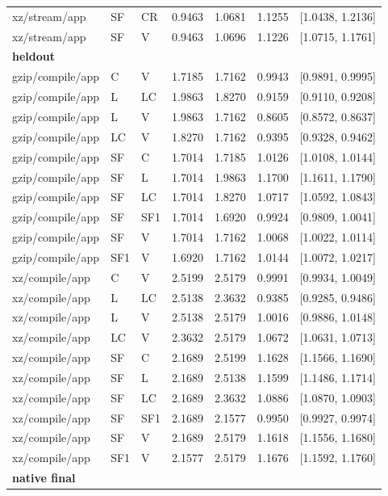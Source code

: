 \begin{longtable}{lllrrrr}
xz/stream/app & SF & CR & 0.9463 & 1.0681 & 1.1255 & [1.0438, 1.2136] \\
xz/stream/app & SF & V & 0.9463 & 1.0696 & 1.1226 & [1.0715, 1.1761] \\
\multicolumn{7}{l}{\textbf{heldout}} \\
gzip/compile/app & C & V & 1.7185 & 1.7162 & 0.9943 & [0.9891, 0.9995] \\
gzip/compile/app & L & LC & 1.9863 & 1.8270 & 0.9159 & [0.9110, 0.9208] \\
gzip/compile/app & L & V & 1.9863 & 1.7162 & 0.8605 & [0.8572, 0.8637] \\
gzip/compile/app & LC & V & 1.8270 & 1.7162 & 0.9395 & [0.9328, 0.9462] \\
gzip/compile/app & SF & C & 1.7014 & 1.7185 & 1.0126 & [1.0108, 1.0144] \\
gzip/compile/app & SF & L & 1.7014 & 1.9863 & 1.1700 & [1.1611, 1.1790] \\
gzip/compile/app & SF & LC & 1.7014 & 1.8270 & 1.0717 & [1.0592, 1.0843] \\
gzip/compile/app & SF & SF1 & 1.7014 & 1.6920 & 0.9924 & [0.9809, 1.0041] \\
gzip/compile/app & SF & V & 1.7014 & 1.7162 & 1.0068 & [1.0022, 1.0114] \\
gzip/compile/app & SF1 & V & 1.6920 & 1.7162 & 1.0144 & [1.0072, 1.0217] \\
xz/compile/app & C & V & 2.5199 & 2.5179 & 0.9991 & [0.9934, 1.0049] \\
xz/compile/app & L & LC & 2.5138 & 2.3632 & 0.9385 & [0.9285, 0.9486] \\
xz/compile/app & L & V & 2.5138 & 2.5179 & 1.0016 & [0.9886, 1.0148] \\
xz/compile/app & LC & V & 2.3632 & 2.5179 & 1.0672 & [1.0631, 1.0713] \\
xz/compile/app & SF & C & 2.1689 & 2.5199 & 1.1628 & [1.1566, 1.1690] \\
xz/compile/app & SF & L & 2.1689 & 2.5138 & 1.1599 & [1.1486, 1.1714] \\
xz/compile/app & SF & LC & 2.1689 & 2.3632 & 1.0886 & [1.0870, 1.0903] \\
xz/compile/app & SF & SF1 & 2.1689 & 2.1577 & 0.9950 & [0.9927, 0.9974] \\
xz/compile/app & SF & V & 2.1689 & 2.5179 & 1.1618 & [1.1556, 1.1680] \\
xz/compile/app & SF1 & V & 2.1577 & 2.5179 & 1.1676 & [1.1592, 1.1760] \\
\multicolumn{7}{l}{\textbf{native final}} \\

\end{longtable}
